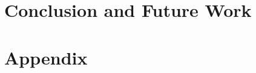 \documentclass[logo,msc,ai]{infthesis}           %
\begin{document}
\chapter{Conclusion and Future Work} \label{ch:conc}




\appendix
\chapter{Appendix}  \label{chap:appendix}



\end{document}
